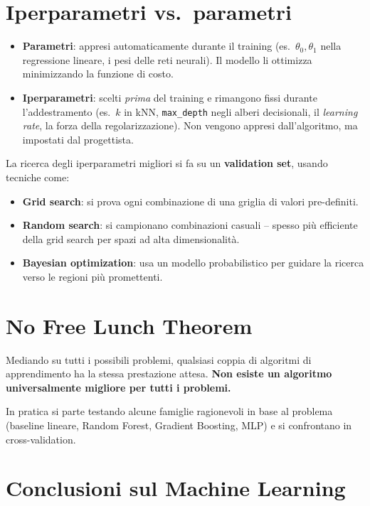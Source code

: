 \section{Iperparametri vs.\ parametri}

\begin{itemize}
    \item \textbf{Parametri}: appresi automaticamente durante il training (es.\ $\theta_0, \theta_1$ nella regressione lineare, i pesi delle reti neurali). Il modello li ottimizza minimizzando la funzione di costo.
    \item \textbf{Iperparametri}: scelti \emph{prima} del training e rimangono fissi durante l'addestramento (es.\ $k$ in kNN, \texttt{max\_depth} negli alberi decisionali, il \emph{learning rate}, la forza della regolarizzazione). Non vengono appresi dall'algoritmo, ma impostati dal progettista.
\end{itemize}

La ricerca degli iperparametri migliori si fa su un \textbf{validation set}, usando tecniche come:
\begin{itemize}
    \item \textbf{Grid search}: si prova ogni combinazione di una griglia di valori pre-definiti.
    \item \textbf{Random search}: si campionano combinazioni casuali -- spesso più efficiente della grid search per spazi ad alta dimensionalità.
    \item \textbf{Bayesian optimization}: usa un modello probabilistico per guidare la ricerca verso le regioni più promettenti.
\end{itemize}

\section{No Free Lunch Theorem}

\begin{thmbox}
Mediando su tutti i possibili problemi, qualsiasi coppia di algoritmi di apprendimento ha la stessa prestazione attesa. \textbf{Non esiste un algoritmo universalmente migliore per tutti i problemi.}

In pratica si parte testando alcune famiglie ragionevoli in base al problema (baseline lineare, Random Forest, Gradient Boosting, MLP) e si confrontano in cross-validation.
\end{thmbox}

\section{Conclusioni sul Machine Learning}


